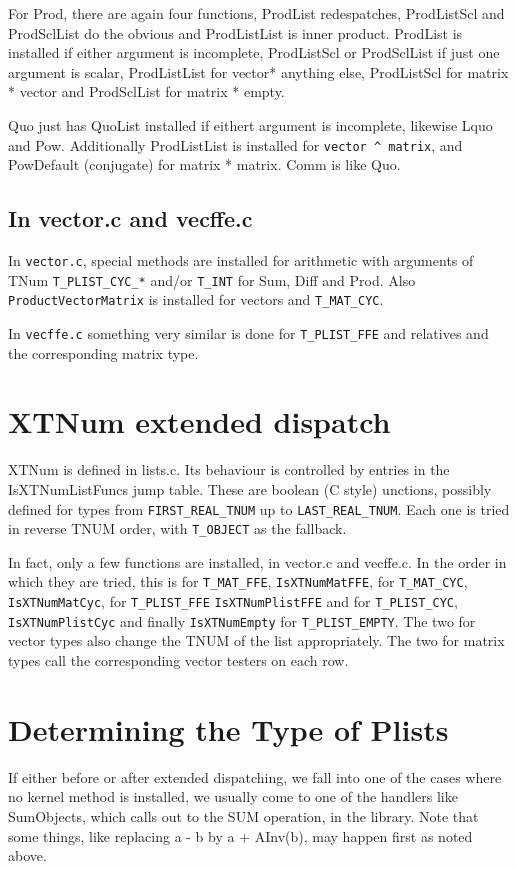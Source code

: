 \documentclass{article}
\begin{document}
For Prod, there are again four functions, ProdList redespatches,
ProdListScl and ProdSclList do the obvious and ProdListList is inner
product. ProdList is installed if either argument is incomplete,
ProdListScl or ProdSclList if just one argument is scalar,
ProdListList for vector* anything else, ProdListScl
for matrix * vector and ProdSclList for matrix * empty. 

Quo just has QuoList installed if eithert argument is incomplete,
likewise Lquo and Pow. Additionally ProdListList is installed for
\verb|vector ^ matrix|, and PowDefault (conjugate) for matrix * matrix. Comm
is like Quo.

\subsection{In vector.c and vecffe.c}

In \verb|vector.c|, special methods are installed for arithmetic with
arguments of TNum \verb|T_PLIST_CYC_*| and/or \verb|T_INT| for Sum, Diff and
Prod. Also \verb|ProductVectorMatrix| is installed for vectors and
\verb|T_MAT_CYC|.

In \verb|vecffe.c| something very similar is done for
\verb|T_PLIST_FFE| and relatives and the corresponding matrix type.



\section{XTNum extended dispatch}

XTNum is defined in lists.c. Its behaviour is controlled by entries
in the IsXTNumListFuncs jump table. These are boolean (C style)
unctions, possibly defined for types from \verb|FIRST_REAL_TNUM| up to
\verb|LAST_REAL_TNUM|. Each one is tried in reverse TNUM order, with
\verb|T_OBJECT| as the fallback.

In fact, only a few functions are installed, in vector.c and
vecffe.c. In the order in which they are tried, this is for \verb|T_MAT_FFE|,
\verb|IsXTNumMatFFE|, for \verb|T_MAT_CYC|, \verb|IsXTNumMatCyc|, for \verb|T_PLIST_FFE|
\verb|IsXTNumPlistFFE| and for \verb|T_PLIST_CYC|, \verb|IsXTNumPlistCyc| and finally
\verb|IsXTNumEmpty| for \verb|T_PLIST_EMPTY|. The two for vector types also change
the TNUM of the list appropriately. The two for matrix types call the
corresponding vector testers on each row.

\section{Determining the Type of Plists}
If either before or after extended dispatching, we fall into one of
the cases where no kernel method is installed, we usually come to one
of the handlers like SumObjects, which calls out to the SUM operation,
in the library. Note that some things, like replacing a - b by a +
AInv(b), may happen first as noted above.
\end{document}
